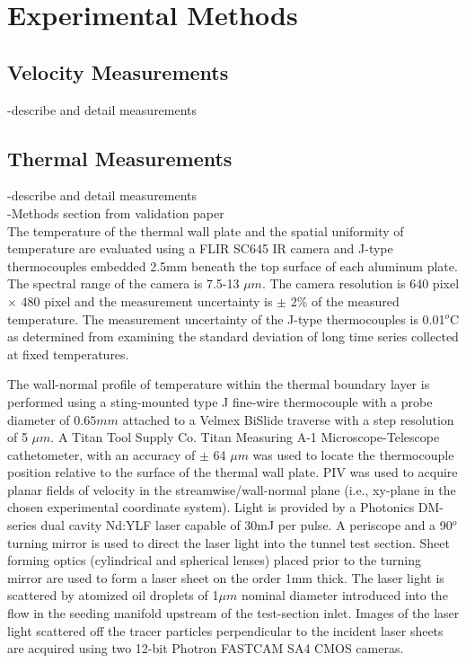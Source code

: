 \chapter{Experimental Methods}

\section{Velocity Measurements}
-describe and detail measurements\\


\section{Thermal Measurements}
-describe and detail measurements\\

-Methods section from validation paper\\
The temperature of the thermal wall plate and the spatial uniformity of temperature are evaluated using a FLIR SC645 IR camera and J-type thermocouples embedded 2.5mm beneath the top surface of each aluminum plate. The spectral range of the camera is 7.5-13 $\mu m$. The camera resolution is 640 pixel $\times$ 480 pixel and the measurement uncertainty is $\pm$ 2\% of the measured temperature. The measurement uncertainty of the J-type thermocouples is 0.01$^o$C as determined from examining the standard deviation of long time series collected at fixed temperatures. 

The wall-normal profile of temperature within the thermal boundary layer is performed using a sting-mounted type J fine-wire thermocouple with a probe diameter of $0.65mm$ attached to a Velmex BiSlide traverse with a step resolution of 5 $\mu m$.  A Titan Tool Supply Co. Titan Measuring A-1 Microscope-Telescope cathetometer, with an accuracy of $\pm$ 64 $\mu m$ was used to locate the thermocouple position relative to the surface of the thermal wall plate. 
PIV was used to acquire planar fields of velocity in the streamwise/wall-normal plane (i.e., xy-plane in the chosen
experimental coordinate system). %
Light is provided by a Photonics DM-series dual cavity Nd:YLF laser capable of 30mJ per pulse. A periscope and a 90$^o$ turning mirror is used to direct the laser light into the tunnel test section. Sheet forming optics (cylindrical and spherical lenses) placed prior to the turning mirror are used to form a laser sheet on the order 1mm thick. The laser light is scattered by atomized oil droplets of 1$\mu m$ nominal diameter introduced into the flow in the seeding manifold upstream of the test-section inlet. Images of the laser light scattered off the tracer particles perpendicular to the incident laser sheets are acquired using two 12-bit Photron FASTCAM SA4 CMOS cameras. 

